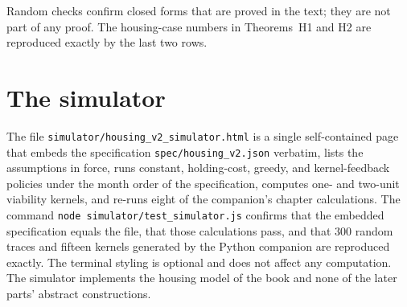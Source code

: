 Random checks confirm closed forms that are proved in the text; they are not part of any proof. The housing-case numbers in Theorems~H1 and H2 are reproduced exactly by the last two rows.

\section*{The simulator}

The file \texttt{simulator/housing\_v2\_simulator.html} is a single self-contained page that embeds the specification \texttt{spec/housing\_v2.json} verbatim, lists the assumptions in force, runs constant, holding-cost, greedy, and kernel-feedback policies under the month order of the specification, computes one- and two-unit viability kernels, and re-runs eight of the companion's chapter calculations. The command \texttt{node simulator/test\_simulator.js} confirms that the embedded specification equals the file, that those calculations pass, and that $300$ random traces and fifteen kernels generated by the Python companion are reproduced exactly. The terminal styling is optional and does not affect any computation. The simulator implements the housing model of the book and none of the later parts' abstract constructions.
